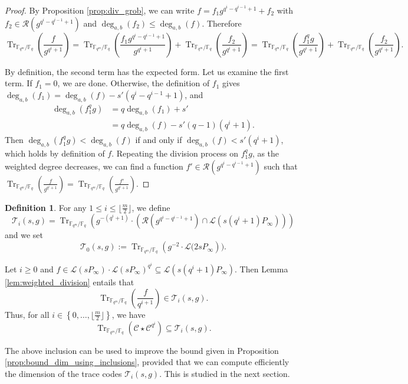 \documentclass[a4paper]{amsart}
\theoremstyle{definition}
\newtheorem{definition}[thm]{Definition}
\theoremstyle{remark}
\newcommand{\calL}{\mathcal{L}}
\newcommand{\calC}{\mathcal{C}}
\newcommand{\calR}{\mathcal{R}}
\newcommand{\calT}{\mathcal{T}}
\newcommand{\fq}{\mathbb{F}_{q}}
\newcommand{\Tr}[1]{\operatorname{Tr}_{\mathbb{F}_{q^m}/\fq}\left(#1\right)}
\newcommand{\set}[1]{\left\{#1\right\}}
\newcommand{\degab}[1]{\deg_{a,b}\left(#1\right)}
\begin{document}
\begin{proof}
By Proposition \ref{prop:div_grob}, we can write $f=f_1 g^{q^i-q^{i-1}+1} +f_2$ with
 $f_2 \in \calR\left(g^{q^i-q^{i-1}+1}\right)$ and $\degab{f_2} \leq \degab{f}$. Therefore
 \[\Tr{\frac{f}{g^{q^i+1}}}=\Tr{\frac{f_1 g^{q^i-q^{i-1}+1}}{g^{q^i+1}}} +\Tr{\frac{f_2}{g^{q^i+1}}}= \Tr{\frac{f_1^qg}{g^{q^i+1}}} +\Tr{\frac{f_2}{g^{q^i+1}}}. \]
 
 By definition, the second term has the expected form. Let us examine the first term. If $f_1=0$, we are done. Otherwise, the definition of $f_1$ gives
$\degab{f_1} =\degab{f} - s'(q^i-q^{i-1}+1)$, and
 \begin{align*}
 \degab{f_1^qg}  &= q \degab{f_1} + s'\\
     &= q\degab{f} - s'(q-1)(q^i+1).
 \end{align*} 
Then  $\degab{f_1^qg} < \degab{f}$ if and only if $\degab{f} < s'(q^i+1)$, which holds by definition of $f$. Repeating the division process on $f_1^qg$, as the weighted degree decreases, we can find a function $f' \in \calR\left(g^{q^i-q^{i-1}+1}\right)$ such that $\Tr{\frac{f}{g^{q^i+1}}} = \Tr{\frac{f'}{g^{q^i+1}}} $.
\end{proof}
\begin{definition} \label{def:T_i's}
For any $1 \leq i \leq \lfloor\frac{m}{2}\rfloor$, we define
$$\calT_i(s,g)= \Tr{g^{-(q^i+1)}\cdot \left( \calR\left(g^{q^i-q^{i-1}+1}\right)  \cap \calL(s(q^i+1)P_\infty)\right)}$$
and we set $$\calT_0(s,g) := \Tr{g^{-2} \cdot \calL(2sP_\infty}).$$
\end{definition}

\noindent Let $i \geq 0$ and $f \in \calL(sP_\infty) \cdot \calL(sP_\infty)^{q^i} \subseteq \calL(s(q^i+1)P_\infty)$. Then 
Lemma \ref{lem:weighted_division} entails that 
$$\Tr{\dfrac{f}{q^{i+1}}} \in \calT_i(s,g).$$
Thus, for all $i \in \set{0,\dots,\lfloor \frac{m}{2} \rfloor}$, we have \begin{equation} \label{eq:Tr(C*C^q^i)_dans_T_i}
\Tr{\calC \star \calC^{q^i}} \subseteq \calT_i(s,g).
\end{equation}

The above inclusion can be used to improve the bound given in Proposition \ref{prop:bound_dim_using_inclusions}, provided that we can compute efficiently the dimension of the trace codes $\calT_i(s,g)$. This is studied in the next section.
\end{document}
